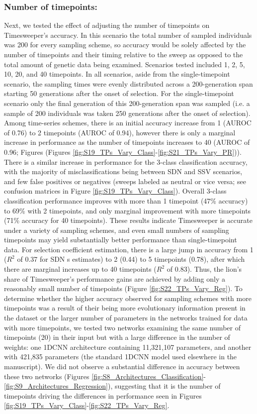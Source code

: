 \subsubsection{Number of timepoints:} Next, we tested the effect of adjusting the number of timepoints on Timesweeper’s accuracy. In this scenario the total number of sampled individuals was 200 for every sampling scheme, so accuracy would be solely affected by the number of timepoints and their timing relative to the sweep as opposed to the total amount of genetic data being examined. Scenarios tested included 1, 2, 5, 10, 20, and 40 timepoints. In all scenarios, aside from the single-timepoint scenario, the sampling times were evenly distributed across a 200-generation span starting 50 generations after the onset of selection. For the single-timepoint scenario only the final generation of this 200-generation span was sampled (i.e. a sample of 200 individuals was taken 250 generations after the onset of selection). Among time-series schemes, there is an initial accuracy increase from 1 (AUROC of 0.76) to 2 timepoints (AUROC of 0.94), however there is only a marginal increase in performance as the number of timepoints increases to 40 (AUROC of 0.96; Figures (Figures \ref{fig:S19_TPs_Vary_Class}-\ref{fig:S21_TPs_Vary_PR})). There is a similar increase in performance for the 3-class classification accuracy, with the majority of misclassifications being between SDN and SSV scenarios, and few false positives or negatives (sweeps labeled as neutral or vice versa; see confusion matrices in Figure \ref{fig:S19_TPs_Vary_Class}). Overall 3-class classification performance improves with more than 1 timepoint (47\% accuracy) to 69\% with 2 timepoints, and only marginal improvement with more timepoints (71\% accuracy for 40 timepoints). These results indicate Timesweeper is accurate under a variety of sampling schemes, and even small numbers of sampling timepoints may yield substantially better performance than single-timepoint data. For selection coefficient estimation, there is a large jump in accuracy from 1 ($R^2$ of 0.37 for SDN s estimates) to 2 (0.44) to 5 timepoints (0.78), after which there are marginal increases up to 40 timepoints ($R^2$ of 0.83). Thus, the lion’s share of Timesweeper’s performance gains are achieved by adding only a reasonably small number of timepoints (Figure \ref{fig:S22_TPs_Vary_Reg}).
To determine whether the higher accuracy observed for sampling schemes with more timepoints was a result of their being more evolutionary information present in the dataset or the larger number of parameters in the networks trained for data with more timepoints, we tested two networks examining the same number of timepoints (20) in their input but with a large difference in the number of weights: one 1DCNN architecture containing 11,321,107 parameters, and another with 421,835 parameters (the standard 1DCNN model used elsewhere in the manuscript). We did not observe a substantial difference in accuracy between these two networks (Figures \ref{fig:S8_Architectures_Classification}-\ref{fig:S9_Architectures_Regression}), suggesting that it is the number of timepoints driving the differences in performance seen in Figures \ref{fig:S19_TPs_Vary_Class}-\ref{fig:S22_TPs_Vary_Reg}. \\

